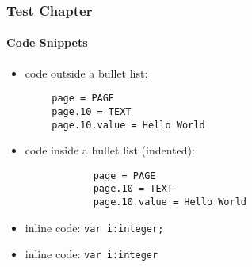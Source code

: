 \begin{frame}[fragile]
	\frametitle{Test Chapter}
	\framesubtitle{Code Snippets}

	\begin{itemize}
		\item code outside a bullet list:
	\end{itemize}

	\begin{lstlisting}
		page = PAGE
		page.10 = TEXT
		page.10.value = Hello World
	\end{lstlisting}

	\begin{itemize}
		\item code inside a bullet list (indented):
		\begin{lstlisting}
			page = PAGE
			page.10 = TEXT
			page.10.value = Hello World
		\end{lstlisting}
	\end{itemize}

	\begin{itemize}
		\item inline code: \lstinline!var i:integer;!
		\item inline code: \texttt{var i:integer}
	\end{itemize}

\end{frame}


